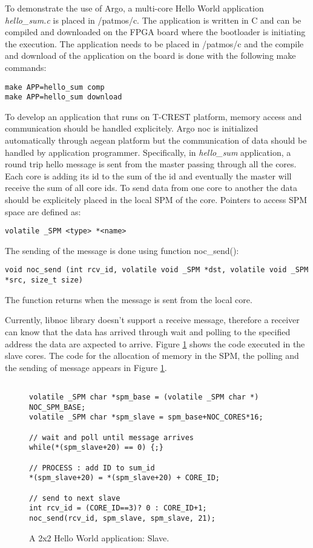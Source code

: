 \documentclass[a4paper,fontsize=10pt,twoside,DIV15,BCOR12mm,headinclude=true,footinclude=false,pagesize,bibtotoc]{scrbook}
\begin{document}
To demonstrate the use of Argo, a multi-core Hello World application \textit{hello\_sum.c} is placed in /patmos/c. The application is written in C and can be compiled and downloaded on the FPGA board where the bootloader is initiating the execution. The application needs to be placed in /patmos/c and the compile and download of the application on the board is done with the following make commands:

\begin{verbatim}
make APP=hello_sum comp
make APP=hello_sum download
\end{verbatim}

To develop an application that runs on T-CREST platform, memory access and communication should be handled explicitely. Argo noc is initialized automatically through aegean platform but the communication of data should be handled by application programmer. Specifically, in \textit{hello\_sum} application, a round trip hello message is sent from the master passing through all the cores. Each core is adding its id to the sum of the id and eventually the master will receive the sum of all core ids. To send data from one core to another the data should be explicitely placed in the local SPM of the core. Pointers to access SPM space are defined as:

\begin{verbatim}
volatile _SPM <type> *<name>
\end{verbatim}

The sending of the message is done using function noc\_send():

\begin{verbatim}
void noc_send (int rcv_id, volatile void _SPM *dst, volatile void _SPM *src, size_t size)
\end{verbatim}

The function returns when the message is sent from the local core.

Currently, libnoc library doesn't support a receive message, therefore a receiver can know that the data has arrived through wait and polling to the specified address the data are axpected to arrive. Figure \ref{fig:hello_multi} shows the code executed in the slave cores. The code for the allocation of memory in the SPM, the polling and the sending of message appears in Figure \ref{fig:hello_multi}.

\begin{figure}
\begin{verbatim}

volatile _SPM char *spm_base = (volatile _SPM char *) NOC_SPM_BASE;
volatile _SPM char *spm_slave = spm_base+NOC_CORES*16;

// wait and poll until message arrives
while(*(spm_slave+20) == 0) {;}

// PROCESS : add ID to sum_id
*(spm_slave+20) = *(spm_slave+20) + CORE_ID;

// send to next slave
int rcv_id = (CORE_ID==3)? 0 : CORE_ID+1;
noc_send(rcv_id, spm_slave, spm_slave, 21);

\end{verbatim}
\caption{A 2x2 Hello World application: Slave.}
\label{fig:hello_multi}
\end{figure}
\end{document}
